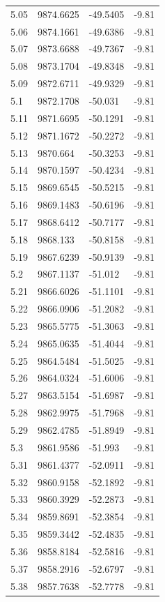 \begin{table}[H]
\begin{tabular}{llll}
5.05 & 9874.6625 & -49.5405 & -9.81 \\
5.06 & 9874.1661 & -49.6386 & -9.81 \\
5.07 & 9873.6688 & -49.7367 & -9.81 \\
5.08 & 9873.1704 & -49.8348 & -9.81 \\
5.09 & 9872.6711 & -49.9329 & -9.81 \\
5.1 & 9872.1708 & -50.031 & -9.81 \\
5.11 & 9871.6695 & -50.1291 & -9.81 \\
5.12 & 9871.1672 & -50.2272 & -9.81 \\
5.13 & 9870.664 & -50.3253 & -9.81 \\
5.14 & 9870.1597 & -50.4234 & -9.81 \\
5.15 & 9869.6545 & -50.5215 & -9.81 \\
5.16 & 9869.1483 & -50.6196 & -9.81 \\
5.17 & 9868.6412 & -50.7177 & -9.81 \\
5.18 & 9868.133 & -50.8158 & -9.81 \\
5.19 & 9867.6239 & -50.9139 & -9.81 \\
5.2 & 9867.1137 & -51.012 & -9.81 \\
5.21 & 9866.6026 & -51.1101 & -9.81 \\
5.22 & 9866.0906 & -51.2082 & -9.81 \\
5.23 & 9865.5775 & -51.3063 & -9.81 \\
5.24 & 9865.0635 & -51.4044 & -9.81 \\
5.25 & 9864.5484 & -51.5025 & -9.81 \\
5.26 & 9864.0324 & -51.6006 & -9.81 \\
5.27 & 9863.5154 & -51.6987 & -9.81 \\
5.28 & 9862.9975 & -51.7968 & -9.81 \\
5.29 & 9862.4785 & -51.8949 & -9.81 \\
5.3 & 9861.9586 & -51.993 & -9.81 \\
5.31 & 9861.4377 & -52.0911 & -9.81 \\
5.32 & 9860.9158 & -52.1892 & -9.81 \\
5.33 & 9860.3929 & -52.2873 & -9.81 \\
5.34 & 9859.8691 & -52.3854 & -9.81 \\
5.35 & 9859.3442 & -52.4835 & -9.81 \\
5.36 & 9858.8184 & -52.5816 & -9.81 \\
5.37 & 9858.2916 & -52.6797 & -9.81 \\
5.38 & 9857.7638 & -52.7778 & -9.81 \\

\end{tabular}
\end{table}
